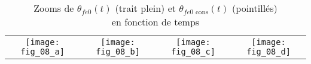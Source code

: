 \begin{table*}[!h]
\centering
\begin{tabular}{cccc}
\texttt{[image: fig\_08\_a]} & 
\texttt{[image: fig\_08\_b]} &
\texttt{[image: fig\_08\_c]} &
\texttt{[image: fig\_08\_d]}
\end{tabular}
\caption{Zooms de $\theta_{fe0}(t)$ (trait plein) et $\theta_{fe0\text{ cons}}(t)$ (pointillés) \\ en fonction de temps}
\end{table*}

%
%
%


%
\normalsize
\fi

